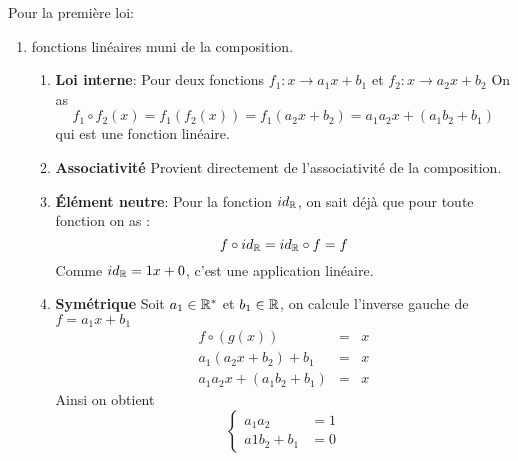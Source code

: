 \documentclass{report}
\begin{document}
\begin{myproof}
  Pour la première loi:
  \begin{enumerate}
    \item fonctions linéaires muni de la composition.
      \begin{enumerate}
        \item \textbf{Loi interne}: Pour deux fonctions $f_1:x \longrightarrow
          a_1x + b_1$ et $f_2: x\longrightarrow a_2x+ b_2$
          On as
          $$
          f_1\circ f_2(x) = f_1(f_2(x)) = f_1(a_2x + b_2) = a_1a_2 x + (a_1b_2 + b_1)
          $$
          qui est une fonction linéaire.

        \item \textbf{Associativité}
          Provient directement de l'associativité de la composition.

        \item \textbf{Élément neutre}: Pour la fonction $id_{\mathbb{R}}$, on sait déjà
          que  pour toute fonction on as :
          $$
          f \circ id_{\mathbb{R}} = id_{\mathbb{R}} \circ f = f 
          $$
          Comme $id_{\mathbb{R}} = 1x + 0$, c'est une application linéaire.
        \item \textbf{Symétrique} Soit $a_1 \in \mathbb{R}^*$  et $b_1\in \mathbb{R}$, on calcule l'inverse
          gauche de $f = a_1 x + b_1$
          \begin{eqnarray*}
            f\circ(g(x)) &=& x\\
            a_1(a_2 x + b_2) + b_1 &=& x\\
            a_1a_2 x + (a_1b_2 + b_1)&=& x
        \end{eqnarray*}
        Ainsi on obtient
        $$
        \begin{cases}
          a_1a_2 &= 1 \\
          a1b_2 + b_1 &= 0
        \end{cases}
        $$


\end{enumerate}
\end{enumerate}
\end{myproof}
\end{document}

